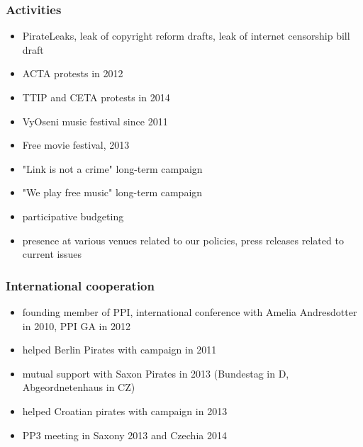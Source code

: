 \begin{frame}
	\frametitle{Activities}
	\begin{itemize}
		\item PirateLeaks, leak of copyright reform drafts, leak of internet censorship bill draft
		\item ACTA protests in 2012
		\item TTIP and CETA protests in 2014
		\item VyOseni music festival since 2011
		\item Free movie festival, 2013
		\item "Link is not a crime" long-term campaign
		\item "We play free music" long-term campaign
		\item participative budgeting
		\item presence at various venues related to our policies, press releases related to current issues

	\end{itemize}
\end{frame}

\begin{frame}
	\frametitle{International cooperation}
	\begin{itemize}
		\item founding member of PPI, international conference with Amelia Andresdotter in 2010, PPI GA in 2012
		\item helped Berlin Pirates with campaign in 2011
		\item mutual support with Saxon Pirates in 2013 (Bundestag in D, Abgeordnetenhaus in CZ)
		\item helped Croatian pirates with campaign in 2013
		\item PP3 meeting in Saxony 2013 and Czechia 2014
	\end{itemize}
\end{frame}
